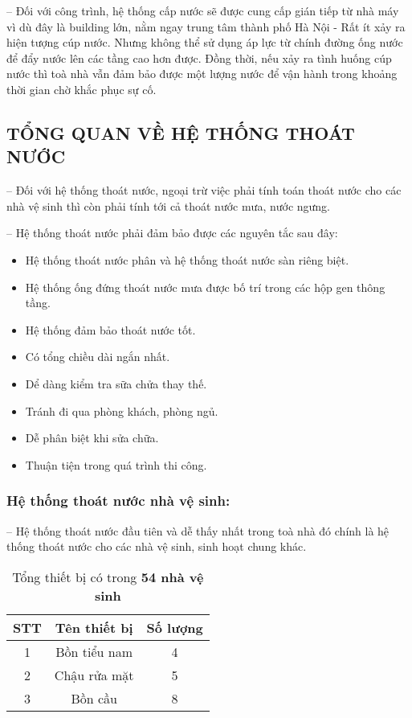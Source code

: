 		-- Đối với công trình, hệ thống cấp nước sẽ được cung cấp gián tiếp từ nhà máy vì dù đây là building lớn, nằm ngay trung tâm thành phố Hà Nội - Rất ít xảy ra hiện tượng cúp nước. Nhưng không thể sử dụng áp lực từ chính đường ống nước để đẩy nước lên các tầng cao hơn được. Đồng thời, nếu xảy ra tình huống cúp nước thì toà nhà vẫn đảm bảo được một lượng nước để vận hành trong khoảng thời gian chờ khắc phục sự cố.
		
	\subsection{TỔNG QUAN VỀ HỆ THỐNG THOÁT NƯỚC}
	-- Đối với hệ thống thoát nước, ngoại trừ việc phải tính toán thoát nước cho các nhà vệ sinh thì còn phải tính tới cả thoát nước mưa, nước ngưng.
	
	-- Hệ thống thoát nước phải đảm bảo được các nguyên tắc sau đây:
	\begin{itemize}[leftmargin=2.2cm]
		\setlength\itemsep{1mm}
		\item Hệ thống thoát nước phân và hệ thống thoát nước sàn riêng biệt. 
		\item Hệ thống ống đứng thoát nước mưa được bố trí trong các hộp gen thông tầng.
		\item Hệ thống đảm bảo thoát nước tốt. 
		\item Có tổng chiều dài ngắn nhất. 
		\item Dể dàng kiểm tra sữa chửa thay thế. 
		\item Tránh đi qua phòng khách, phòng ngủ. 
		\item Dễ phân biệt khi sửa chữa. 
		\item Thuận tiện trong quá trình thi công. 
	\end{itemize}
	\subsubsection{Hệ thống thoát nước nhà vệ sinh:}	
	-- Hệ thống thoát nước đầu tiên và dễ thấy nhất trong toà nhà đó chính là hệ thống thoát nước cho các nhà vệ sinh, sinh hoạt chung khác.
	
\begin{table}[H]
		\vspace{-0.5cm}
  		\centering
  		\caption{Tổng thiết bị có trong \textbf{54 nhà vệ sinh}}
    	\begin{tabular}{|c|c|c|}
    	\hline
    	\multicolumn{1}{|c|}{\textbf{STT}} & \multicolumn{1}{c|}{\textbf{Tên thiết bị}} & \multicolumn{1}{c|}{\textbf{Số lượng}} \\
    	\hline
    	1     & Bồn tiểu nam & 4 \\
    	\hline
    	2     & Chậu rửa mặt & 5 \\
    	\hline
    	3     & Bồn cầu & 8 \\
   	 	\hline
    	\end{tabular}%
  		\label{tab:tong_thoat_nvs}
\end{table}
	 
